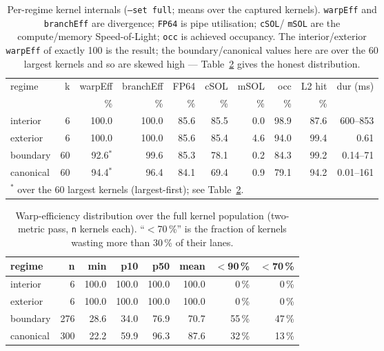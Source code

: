 \documentclass[
	english,
	letterpaper, oneside
]{article}
\begin{document}
\begin{table}[H]
    \centering
    \caption{Per-regime kernel internals (\texttt{--set full}; means over the
             captured kernels). \texttt{warpEff} and \texttt{branchEff} are
             divergence; \texttt{FP64} is pipe utilisation; \texttt{cSOL}/%
             \texttt{mSOL} are the compute/memory Speed-of-Light; \texttt{occ} is
             achieved occupancy. The interior/exterior \texttt{warpEff} of
             exactly 100 is the result; the boundary/canonical values here
             are over the 60 largest kernels and so are skewed high ---
             Table~\ref{tab:dist} gives the honest distribution.}
    \label{tab:regimes-metrics}
    \begin{tabular}{lrrrrrrrrr}
        \hline
        regime & k & warpEff & branchEff & FP64 & cSOL & mSOL & occ & L2 hit & dur (ms) \\
         & & \% & \% & \% & \% & \% & \% & \% & \\
        \hline
        interior  & 6  & 100.0 & 100.0 & 85.6 & 85.5 & 0.0 & 98.9 & 87.6 & 600--853 \\
        exterior  & 6  & 100.0 & 100.0 & 85.6 & 85.4 & 4.6 & 94.0 & 99.4 & 0.61 \\
        boundary  & 60 & 92.6$^\ast$ & 99.6 & 85.3 & 78.1 & 0.2 & 84.3 & 99.2 & 0.14--71 \\
        canonical & 60 & 94.4$^\ast$ & 96.4 & 84.1 & 69.4 & 0.9 & 79.1 & 94.2 & 0.01--161 \\
        \hline
        \multicolumn{10}{l}{\footnotesize $^\ast$ over the 60 largest kernels (largest-first); see Table~\ref{tab:dist}.}
    \end{tabular}
\end{table}

\begin{table}[H]
    \centering
    \caption{Warp-efficiency distribution over the full kernel population
             (two-metric pass, \texttt{n} kernels each). ``$<$70\,\%'' is the
             fraction of kernels wasting more than 30\,\% of their lanes.}
    \label{tab:dist}
    \begin{tabular}{lrrrrrrr}
        \hline
        regime & n & min & p10 & p50 & mean & $<$90\,\% & $<$70\,\% \\
        \hline
        interior  & 6   & 100.0 & 100.0 & 100.0 & 100.0 & 0\,\%  & 0\,\%  \\
        exterior  & 6   & 100.0 & 100.0 & 100.0 & 100.0 & 0\,\%  & 0\,\%  \\
        boundary  & 276 & 28.6  & 34.0  & 76.9  & 70.7  & 55\,\% & 47\,\% \\
        canonical & 300 & 22.2  & 59.9  & 96.3  & 87.6  & 32\,\% & 13\,\% \\
        \hline
    \end{tabular}
\end{table}
\end{document}
